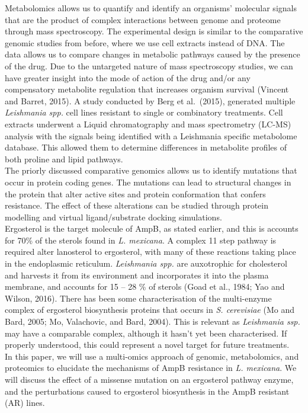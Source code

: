\documentclass{bioinfo}
\begin{document}
Metabolomics allows us to quantify and identify an organisms' molecular
signals that are the product of complex interactions between genome and
proteome through mass spectroscopy. The experimental design is similar
to the comparative genomic studies from before, where we use cell
extracts instead of DNA. The data allows us to compare changes in
metabolic pathways caused by the presence of the drug. Due to the
untargeted nature of mass spectroscopy studies, we can have greater
insight into the mode of action of the drug and/or any compensatory
metabolite regulation that increases organism survival (Vincent and
Barret, 2015). A study conducted by Berg et al.~(2015), generated
multiple \emph{Leishmania spp.} cell lines resistant to single or
combinatory treatments. Cell extracts underwent a Liquid chromatography
and mass spectrometry (LC-MS) analysis with the signals being identified
with a Leishmania specific metabolome database. This allowed them to
determine differences in metabolite profiles of both proline and lipid
pathways.\\

The priorly discussed comparative genomics allows us to identify
mutations that occur in protein coding genes. The mutations can lead to
structural changes in the protein that alter active sites and protein
conformation that confers resistance. The effect of these alterations
can be studied through protein modelling and virtual ligand/substrate
docking simulations.\\

Ergosterol is the target molecule of AmpB, as stated earlier, and this
is accounts for 70\% of the sterols found in \emph{L. mexicana}. A
complex 11 step pathway is required alter lanosterol to ergosterol, with
many of these reactions taking place in the endoplasmic reticulum.
\emph{Leishmania spp.} are auxotrophic for cholesterol and harvests it
from its environment and incorporates it into the plasma membrane, and
accounts for 15 -- 28 \% of sterols (Goad et al., 1984; Yao and Wilson,
2016). There has been some characterisation of the multi-enzyme complex
of ergosterol biosynthesis proteins that occurs in \emph{S. cerevisiae}
(Mo and Bard, 2005; Mo, Valachovic, and Bard, 2004). This is relevant as
\emph{Leishmania ssp.} may have a comparable complex, although it hasn't
yet been characterised. If properly understood, this could represent a
novel target for future treatments.\\

In this paper, we will use a multi-omics approach of genomic,
metabolomics, and proteomics to elucidate the mechanisms of AmpB
resistance in \emph{L. mexicana}. We will discuss the effect of a
missense mutation on an ergosterol pathway enzyme, and the perturbations
caused to ergosterol biosynthesis in the AmpB resistant (AR) lines.
\end{document}
